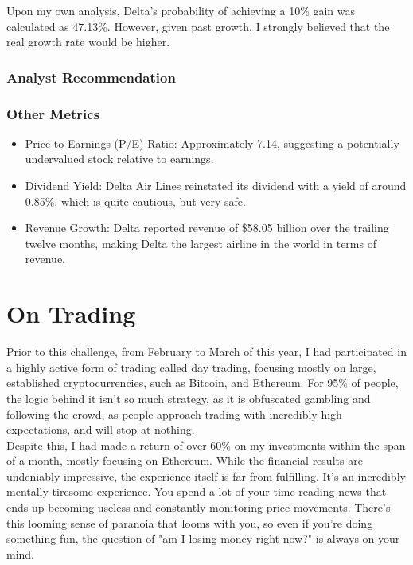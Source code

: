 \documentclass[a4paper, 12pt]{article}
\begin{document}
Upon my own analysis, Delta's probability of achieving a 10\% gain 
was calculated as 47.13\%. However, given past growth, I strongly 
believed that the real growth rate would be higher. 

\subsubsection*{Analyst Recommendation}


\subsubsection*{Other Metrics}
\begin{itemize}
    \item Price-to-Earnings (P/E) Ratio: Approximately 7.14, suggesting a 
    potentially undervalued stock relative to earnings.
    \item Dividend Yield: Delta Air Lines reinstated its dividend with a yield of around 0.85\%,
    which is quite cautious, but very safe.
    \item Revenue Growth: Delta reported revenue of \$58.05 billion over the 
    trailing twelve months, making Delta the largest airline in the world in terms of revenue.
\end{itemize}




\section{On Trading}

Prior to this challenge, from February to March of this year, 
I had participated in a highly active form of trading called day trading, 
focusing mostly on large, established cryptocurrencies, such as Bitcoin, 
and Ethereum. For 95\% of people, the logic behind it isn't so much strategy, 
as it is obfuscated gambling and following the crowd, as people approach
trading with incredibly high expectations, and will stop at nothing. \\

Despite this, I had made a return of over 60\% on my investments within the
span of a month, mostly focusing on Ethereum. While the financial results are
undeniably impressive, the experience itself is far from fulfilling. It's 
an incredibly mentally tiresome experience. You spend a lot of your time reading
news that ends up becoming useless and constantly monitoring price movements.
There's this looming sense of paranoia that looms with you, so even if you're doing
something fun, the question of "am I losing money right now?" is always on your mind. \\
\end{document}
